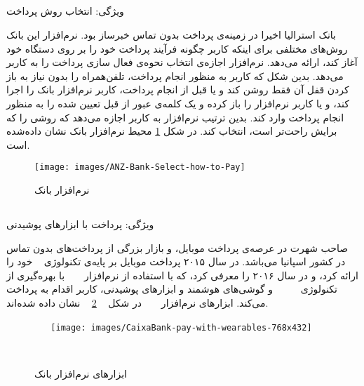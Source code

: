 \documentclass[oneside]{report}
\begin{document}
		\subsection{{\small {}}}
		ویژگی: انتخاب روش پرداخت
		
		بانک 
			 {\normalsize {} }
			 	استرالیا اخیرا در زمینه‌ی پرداخت بدون تماس 
			 	خبرساز بود. نرم‌افزار این بانک روش‌های مختلفی  برای اینکه کاربر چگونه فرآیند پرداخت خود را بر روی دستگاه خود آغاز کند، ارائه می‌دهد. 
 نرم‌افزار اجازه‌ی انتخاب نحوه‌ی فعال سازی پرداخت را به کاربر می‌دهد. بدین شکل که کاربر به منظور انجام پرداخت، تلفن‌همراه را بدون نیاز به باز کردن قفل آن فقط روشن کند و یا قبل از انجام پرداخت، کاربر نرم‌افزار بانک
 			 {\normalsize {} }
 			 را اجرا کند، و یا کاربر نرم‌افزار 
 			 			 {\normalsize {} }
 			 			 را باز کرده و یک کلمه‌ی عبور از قبل تعیین شده را به منظور انجام پرداخت وارد کند.
			 	بدین ترتیب نرم‌افزار به کاربر اجازه می‌دهد
			 	که روشی را که برایش راحت‌تر است، انتخاب کند.
			 	در شکل 
			 	\ref{fig:anz-bank-select-how-to-pay}
محیط نرم‌افزار بانک
			 {\normalsize {} }
نشان داده‌شده است. 
			 	\begin{figure}[h]
			 		\centering
			 		\texttt{[image: images/ANZ-Bank-Select-how-to-Pay]}
			 		\caption{نرم‌افزار بانک 	{\footnotesize {}} }
			 		\label{fig:anz-bank-select-how-to-pay}
			 	\end{figure}
			 			
		\subsection{{\small {}}}
		ویژگی: پرداخت با ابزار‌های پوشیدنی
		
			 {\normalsize {}} 
			 صاحب شهرت در عرصه‌ی پرداخت موبایل،  و بازار بزرگی از پرداخت‌های بدون تماس در کشور اسپانیا می‌باشد. در سال ۲۰۱۵ پرداخت موبایل بر پایه‌ی تکنولوژی 
			  	 			 				 {\normalsize {}}
خود را ارائه کرد، و در سال ۲۰۱۶ {\normalsize{}}را معرفی کرد،  که با استفاده از نرم‌افزار 
			 			 				 {\normalsize {}}	
			 			 				 با بهره‌گیری از تکنولوژی‌
			 			 			 {\normalsize{}}	 	
			 			 			 و گوشی‌های هوشمند و ابزار‌های پوشیدنی،   کاربر اقدام به پرداخت می‌کند. ابزار‌های نرم‌افزار 
			 			 			 			 {\normalsize {} }
			 			 			 			 در شکل 
			 			 			 			 \ref{fig:caixabank-pay-with-wearables-768x432}
			 			 		نشان‌ داده‌ شده‌اند. 
			 			 			 
			 			 			 \begin{figure}[h]
			 			 			 	\centering
			 			 			 	\texttt{[image: images/CaixaBank-pay-with-wearables-768x432]}
			 			 			 	\caption{ابزار‌های نرم‌افزار بانک {\footnotesize {}}}
			 			 			 	\label{fig:caixabank-pay-with-wearables-768x432}
			 			 			 \end{figure}
			 			 			 				 			 			 		
	\newpage		 			 			 		
\end{document}

